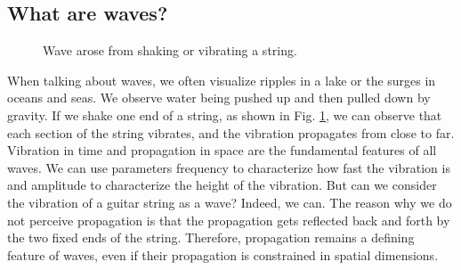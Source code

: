 \documentclass[oneside, letter, 12pt]{book}
\begin{document}
\subsection{What are waves?}
\begin{figure}[h]\label{String}
\caption{Wave arose from shaking or vibrating a string.}
\end{figure}

When talking about waves, we often visualize ripples in a lake or the surges in oceans and seas. We observe water being pushed up and then pulled down by gravity. If we shake one end of a string, as shown in Fig. \ref{String}, we can observe that each section of the string vibrates, and the vibration propagates from close to far. Vibration in time and propagation in space are the fundamental features of all waves. We can use parameters frequency to characterize how fast the vibration is and amplitude to characterize the height of the vibration. But can we consider the vibration of a guitar string as a wave? Indeed, we can. The reason why we do not perceive propagation is that the propagation gets reflected back and forth by the two fixed ends of the string. Therefore, propagation remains a defining feature of waves, even if their propagation is constrained in spatial dimensions.
\end{document}
